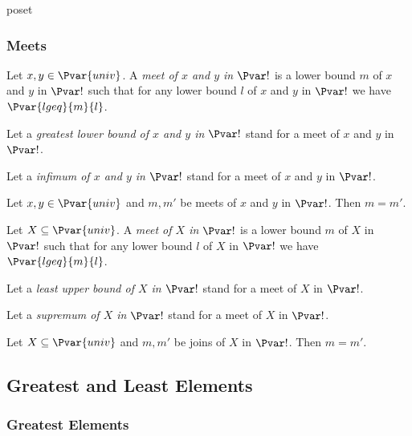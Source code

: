 \documentclass{stex}
\begin{document}
\begin{smodule}{poset}
  \subsubsection{Meets}

  \begin{forthel}
    \begin{definition}
      Let $x,y\in\Pvar{univ}$.
      A \emph{meet of $x$ and $y$ in $\Pvar!$} is a lower bound $m$ of $x$ and $y$ in $\Pvar!$ such that for any lower bound $l$ of $x$ and $y$ in $\Pvar!$ we have $\Pvar{lgeq}{m}{l}$.
    \end{definition}

    Let a \emph{greatest lower bound of $x$ and $y$ in $\Pvar!$} stand for a meet of $x$ and $y$ in $\Pvar!$.

    Let a \emph{infimum of $x$ and $y$ in $\Pvar!$} stand for a meet of $x$ and $y$ in $\Pvar!$.

    \begin{proposition}
      Let $x,y\in\Pvar{univ}$ and $m,m'$ be meets of $x$ and $y$ in $\Pvar!$.
      Then $m=m'$.
    \end{proposition}
    
    \begin{definition}
      Let $X\subseteq\Pvar{univ}$.
      A \emph{meet of $X$ in $\Pvar!$} is a lower bound $m$ of $X$ in $\Pvar!$ such that for any lower bound $l$ of $X$ in $\Pvar!$ we have $\Pvar{lgeq}{m}{l}$.
    \end{definition}

    Let a \emph{least upper bound of $X$ in $\Pvar!$} stand for a meet of $X$ in $\Pvar!$.

    Let a \emph{supremum of $X$ in $\Pvar!$} stand for a meet of $X$ in $\Pvar!$.

    \begin{proposition}
      Let $X\subseteq\Pvar{univ}$ and $m,m'$ be joins of $X$ in $\Pvar!$.
      Then $m=m'$.
    \end{proposition}
  \end{forthel}

  \subsection{Greatest and Least Elements}

  \subsubsection{Greatest Elements}


\end{smodule}
\end{document}

